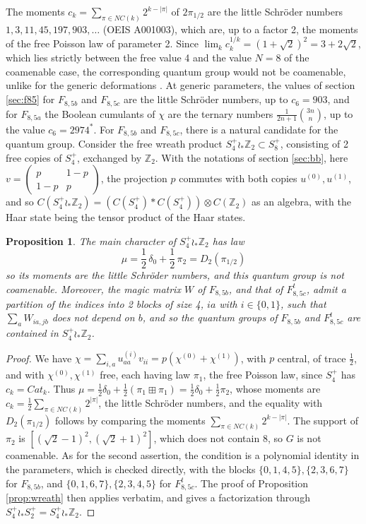 \documentclass[11pt]{amsart}
\newtheorem{proposition}[theorem]{Proposition}
\begin{document}
The moments $c_k=\sum_{\pi\in NC(k)}2^{k-|\pi|}$ of $2\pi_{1/2}$ are the little Schr\"oder numbers $1,3,11,45,197,903,\ldots$ (OEIS A001003), which are, up to a factor 2, the moments of the free Poisson law of parameter 2. Since $\lim_kc_k^{1/k}=(1+\sqrt2)^2=3+2\sqrt2$, which lies strictly between the free value 4 and the value $N=8$ of the coamenable case, the corresponding quantum group would not be coamenable, unlike for the generic deformations \cite{bb3}. At generic parameters, the values of section \ref{sec:f85} for $F_{8,5b}$ and $F_{8,5c}$ are the little Schr\"oder numbers, up to $c_6=903$, and for $F_{8,5a}$ the Boolean cumulants of $\chi$ are the ternary numbers $\frac{1}{2n+1}\binom{3n}{n}$, up to the value $c_6=2974^*$. For $F_{8,5b}$ and $F_{8,5c}$, there is a natural candidate for the quantum group. Consider the free wreath product $S_4^+\wr_*\mathbb Z_2\subset S_8^+$, consisting of 2 free copies of $S_4^+$, exchanged by $\mathbb Z_2$. With the notations of section \ref{sec:bb}, here $v=\begin{pmatrix}p&1-p\\1-p&p\end{pmatrix}$, the projection $p$ commutes with both copies $u^{(0)},u^{(1)}$, and so $C(S_4^+\wr_*\mathbb Z_2)=(C(S_4^+)*C(S_4^+))\otimes C(\mathbb Z_2)$ as an algebra, with the Haar state being the tensor product of the Haar states.

\begin{proposition}\label{prop:f85}
The main character of $S_4^+\wr_*\mathbb Z_2$ has law
$$\mu=\frac{1}{2}\,\delta_0+\frac{1}{2}\,\pi_2=D_2(\pi_{1/2})$$
so its moments are the little Schr\"oder numbers, and this quantum group is not coamenable. Moreover, the magic matrix $W$ of $F_{8,5b}$, and that of $F_{8,5c}^t$, admit a partition of the indices into 2 blocks of size 4, $ia$ with $i\in\{0,1\}$, such that $\sum_aW_{ia,jb}$ does not depend on $b$, and so the quantum groups of $F_{8,5b}$ and $F_{8,5c}^t$ are contained in $S_4^+\wr_*\mathbb Z_2$.
\end{proposition}

\begin{proof}
We have $\chi=\sum_{i,a}u^{(i)}_{aa}v_{ii}=p(\chi^{(0)}+\chi^{(1)})$, with $p$ central, of trace $\frac{1}{2}$, and with $\chi^{(0)},\chi^{(1)}$ free, each having law $\pi_1$, the free Poisson law, since $S_4^+$ has $c_k=Cat_k$. Thus $\mu=\frac{1}{2}\delta_0+\frac{1}{2}(\pi_1\boxplus\pi_1)=\frac{1}{2}\delta_0+\frac{1}{2}\pi_2$, whose moments are $c_k=\frac{1}{2}\sum_{\pi\in NC(k)}2^{|\pi|}$, the little Schr\"oder numbers, and the equality with $D_2(\pi_{1/2})$ follows by comparing the moments $\sum_{\pi\in NC(k)}2^{k-|\pi|}$. The support of $\pi_2$ is $[(\sqrt2-1)^2,(\sqrt2+1)^2]$, which does not contain 8, so $G$ is not coamenable. As for the second assertion, the condition is a polynomial identity in the parameters, which is checked directly, with the blocks $\{0,1,4,5\},\{2,3,6,7\}$ for $F_{8,5b}$, and $\{0,1,6,7\},\{2,3,4,5\}$ for $F_{8,5c}^t$. The proof of Proposition \ref{prop:wreath} then applies verbatim, and gives a factorization through $S_4^+\wr_*S_2^+=S_4^+\wr_*\mathbb Z_2$.
\end{proof}
\end{document}

